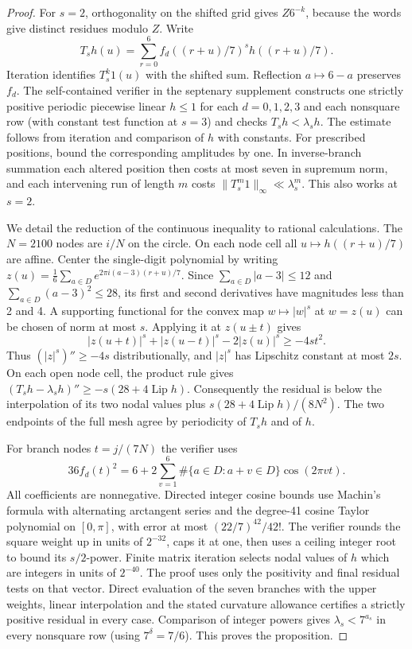 \documentclass[11pt,a4paper]{article}
\theoremstyle{paperplain}
\numberwithin{equation}{section}
\begin{document}
\begin{proof}
For \(s=2\), orthogonality on the shifted grid gives \(Z6^{-k}\),
because the words give distinct residues modulo \(Z\). Write
\[
 T_s h(u)=\sum_{r=0}^6 f_d((r+u)/7)^s h((r+u)/7).
\]
Iteration identifies \(T_s^k1(u)\) with the shifted sum. Reflection
\(a\mapsto6-a\) preserves \(f_d\). The self-contained verifier
 in the septenary supplement constructs one strictly positive periodic
piecewise linear \(h\le1\) for each \(d=0,1,2,3\) and each nonsquare row (with constant test function at \(s=3\)) and checks \(T_s h<\lambda_s h\). The estimate follows from
iteration and comparison of \(h\) with constants. For prescribed
positions, bound the corresponding amplitudes by one. In inverse-branch
summation each altered position then costs at most seven in supremum
norm, and each intervening run of length \(m\) costs
\(\|T_s^m1\|_\infty\ll\lambda_s^m\). This also works at \(s=2\).

We detail the reduction of the continuous inequality to rational
calculations. The \(N=2100\) nodes are \(i/N\) on the circle. On each
node cell all \(u\mapsto h((r+u)/7)\) are affine. Center the single-digit
polynomial by writing \(z(u)=\frac16\sum_{a\in D}
e^{2\pi i(a-3)(r+u)/7}\). Since \(\sum_{a\in D}|a-3|\le12\) and
\(\sum_{a\in D}(a-3)^2\le28\), its first and second derivatives have
magnitudes less than 2 and 4. A supporting functional for the convex
map \(w\mapsto |w|^s\) at \(w=z(u)\) can be chosen of norm at most
\(s\). Applying it at \(z(u\pm t)\) gives
\[
 |z(u+t)|^s+|z(u-t)|^s-2|z(u)|^s\ge -4s t^2.
\]
Thus \((|z|^s)''\ge-4s\) distributionally, and \(|z|^s\) has Lipschitz
constant at most \(2s\). On each open node cell, the product rule gives
\((T_s h-\lambda_s h)''\ge -s(28+4\operatorname{Lip}h)\).
Consequently the residual is below the interpolation of its two nodal
values plus \(s(28+4\operatorname{Lip}h)/(8N^2)\). The two endpoints
of the full mesh agree by periodicity of \(T_s h\) and of \(h\).

For branch nodes \(t=j/(7N)\) the verifier uses
\[
 36 f_d(t)^2
 =6+2\sum_{v=1}^6 \#\{a\in D:a+v\in D\}\cos(2\pi vt).
\]
All coefficients are nonnegative. Directed integer cosine bounds use
Machin's formula with alternating arctangent series and the degree-41
cosine Taylor polynomial on \([0,\pi]\), with error at most
\((22/7)^{42}/42!\). The verifier rounds the square weight up in units
of \(2^{-32}\), caps it at one, then uses a ceiling integer root to
bound its \(s/2\)-power. Finite matrix iteration selects nodal values
of \(h\) which are integers in units of \(2^{-40}\).
The proof uses only the positivity and final residual tests on that
vector. Direct evaluation of the seven branches with the upper weights,
linear interpolation and the stated curvature allowance certifies a
strictly positive residual in every case. Comparison of integer powers gives \(\lambda_s<7^{a_s}\) in
every nonsquare row (using \(7^\delta=7/6\)). This proves the proposition.
\end{proof}
\end{document}
